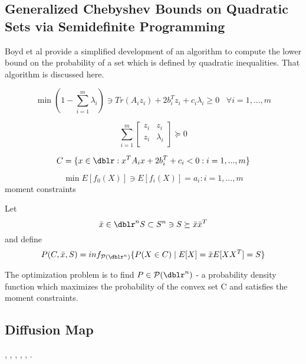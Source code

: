 \subsection{Generalized Chebyshev Bounds on Quadratic Sets via Semidefinite Programming}

Boyd et al  \citet{SDPVandenberghe_generalizedchebyshev} provide a simplified development of an algorithm to compute the lower bound on the probability of a set which is defined by quadratic inequalities. That algorithm is discussed here.

\begin{equation}
\min (1-  \sum\limits_{i=1}^{m} \lambda_i)  \ni Tr( A_i z_i) + 2 b_{i}^{T} z_i + c_i \lambda_i \geqslant 0 \;\;\; \forall i=1, ... , m
\end{equation}

\begin{equation}  \sum\limits_{i=1}^{m}  [
\begin{array}{cc}
z_i & z_i \\
z_i & \lambda_i \\
\end{array} ] \succeq 0 \end{equation}

\begin{equation}  C = \{ x \in \dblr :  x^T A_i x + 2 b_{i}^{T} +c_i <0 : i=1, ...,m \} \end{equation}

\begin{equation}
\min E[f_0(X)] \ni E[f_i(X)] = a_i : i=1, ...,m
\end{equation}
 moment constraints

Let
\begin{equation}
 \bar{x} \in \dblr^n S \subset S^n \ni S \succeq \bar{x} \bar{x}^T
\end{equation}
  and define
 \begin{equation}
 P(C,\bar{x},S) = inf_{\mathcal{P}(\dblr^n)} \{P(X \in C) \mid E[X] = \bar{x} E[X X^T] = S \}
 \end{equation}

The optimization problem is to find $ P \in \mathcal{P}(\dblr^n) $ - a probability density function which maximizes the probability of the convex set C and satisfies the moment constraints.


\subsection{Diffusion Map}
\cite{DMBremerabstractdiffusion}, \cite{DMCarnegieinformationdiffusion}, \cite{DMCoifmandiffusionmaps},
\cite{DMKubota00reactiondiffusionsystems}, \cite{DMLafferty05diffusionkernels},
\cite{DMNadler06diffusionmaps}.

